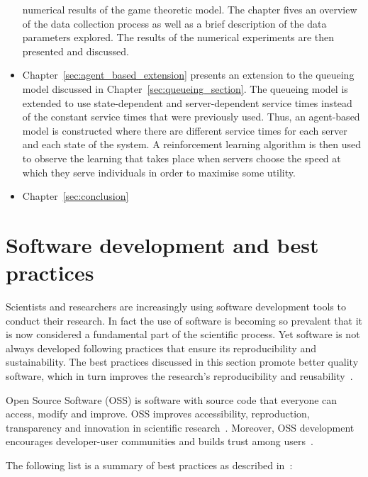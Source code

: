 \begin{itemize}
    numerical results of the game theoretic model.
    The chapter fives an overview of the data collection process as well as a
    brief description of the data parameters explored.
    The results of the numerical experiments are then presented and discussed.
    \item Chapter~\ref{sec:agent_based_extension} presents an extension to the
    queueing model discussed in Chapter~\ref{sec:queueing_section}.
    The queueing model is extended to use state-dependent and server-dependent
    service times instead of the constant service times that were previously
    used.
    Thus, an agent-based model is constructed where there are different service
    times for each server and each state of the system.
    A reinforcement learning algorithm is then used to observe the learning
    that takes place when servers choose the speed at which they serve
    individuals in order to maximise some utility.
    \item Chapter~\ref{sec:conclusion}
\end{itemize}




\section{Software development and best practices}\label{sec:intro_software}

Scientists and researchers are increasingly using software development tools to
conduct their research.
In fact the use of software is becoming so prevalent that it is now
considered a fundamental part of the scientific process.
Yet software is not always developed following practices that ensure its
reproducibility and sustainability.
The best practices discussed in this section promote better quality software,
which in turn improves the research's reproducibility and
reusability~\cite{jimenez2017four}.

Open Source Software (OSS) is software with source code that everyone can
access, modify and improve.
OSS improves accessibility, reproduction, transparency and innovation in
scientific research~\cite{mulgan2005wide}.
Moreover, OSS development encourages developer-user communities and builds
trust among users~\cite{mckiernan2016open}.

The following list is a summary of best practices as described
in~\cite{wilson2014best}:


